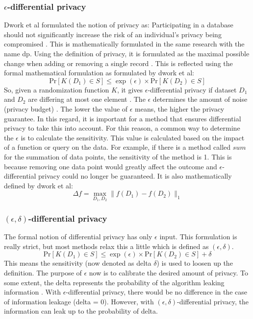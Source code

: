 \subsubsection{$\epsilon$-differential privacy}
Dwork et al formulated the notion of privacy as: Participating in a database should not significantly increase the risk of an individual's privacy being compromised \cite{dwork_differential_2006}.
This is mathematically formulated in the same research with the name \gls{dp}.
Using the definition of privacy, it is formulated as the maximal possible change when adding or removing a single record \citep{dwork_differential_2006, friedman_data_2010}.
This is reflected using the formal mathematical formulation as formulated by dwork et al:
\begin{equation}
  {\mathrm{Pr}}[K(D_{1})\in S]\leq\exp(\epsilon)\times{\mathrm{Pr}}[K(D_{2})\in S]
  \label{pure-dp}
\end{equation}
So, given a randomization function $K$, it gives $\epsilon$-differential privacy if dataset $D_1$ and $D_2$ are differing at most one element \citep{dwork_differential_2006}.
The $\epsilon$ determines the amount of noise (privacy budget) \citep{friedman_data_2010}.
The lower the value of $\epsilon$ means, the higher the privacy guarantee.
In this regard, it is important for a method that ensures differential privacy to take this into account.
For this reason, a common way to determine the $\epsilon$ is to calculate the sensitivity.
This value is calculated based on the impact of a function or query on the data.
For example, if there is a method called $sum$ for the summation of data points, the sensitivity of the method is 1.
This is because removing one data point would greatly affect the outcome and $\epsilon$-differential privacy could no longer be guaranteed.
It is also mathematically defined by dwork et al:
\begin{equation}
  \Delta f=\operatorname*{max}_{D_{1},D_{2}}\|f(D_{1})-f(D_{2})\|_{1}
  \label{sensitivity-dp}
\end{equation}
\subsubsection{$(\epsilon, \delta)$-differential privacy}
The formal notion of differential privacy has only $\epsilon$ input.
This formulation is really strict, but most methods relax this a little which is defined as $(\epsilon, \delta)$.
\begin{equation}
  {\mathrm{Pr}}[K(D_{1})\in S]\leq\exp(\epsilon)\times{\mathrm{Pr}}[K(D_{2})\in S] + \delta
  \label{approxiate-dp}
\end{equation}
This means the sensitivity (now denoted as delta $\delta$) is used to loosen up the definition.
The purpose of $\epsilon$ now is to calibrate the desired amount of privacy.
To some extent, the delta represents the probability of the algorithm leaking information \citep{aitsam_differential_2021}.
With $\epsilon$-differential privacy, there would be no difference in the case of information leakage (delta = 0).
However, with $(\epsilon, \delta)$-differential privacy, the information can leak up to the probability of delta.

